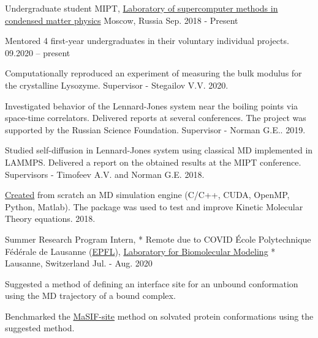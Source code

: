 

\begin{cventries}

  \cventry
    {Undergraduate student} %
    {MIPT, \href{http://en.smcmp.ru/}{Laboratory of supercomputer methods
in condensed matter physics}} %
    {Moscow, Russia} %
    {Sep. 2018 - Present} %
    {
      \begin{cvitems} %
        \item {\textsf{Mentored 4} first-year \textsf{undergraduates} in their voluntary individual projects. 09.2020 -- present}
        \item {Computationally reproduced an experiment of measuring the bulk modulus for the \textsf{crystalline Lysozyme}. Supervisor - Stegailov V.V. 2020.}
        \item {Investigated behavior of the \textsf{Lennard-Jones system} near the boiling points via space-time correlators. Delivered reports at \textsf{several conferences}. The project was supported by the Russian Science Foundation. Supervisor - Norman G.E.. 2019.}
      	\item {Studied self-diffusion in Lennard-Jones system using classical MD implemented in \textsf{LAMMPS}. Delivered a report on the obtained results at the MIPT conference. Supervisors - Timofeev A.V. and Norman G.E. 2018.}
      	\item {\href{https://github.com/PolyachenkoYA/molecules}{Created} from scratch an MD simulation engine (\textsf{C/C++, CUDA, OpenMP, Python, Matlab}). The package was used to test and improve Kinetic Molecular Theory equations.  2018.}
      \end{cvitems}
    }
    
  \cventry
    {Summer Research Program Intern, * Remote due to COVID} %
    {École Polytechnique Fédérale de Lausanne (\href{https://www.epfl.ch/en/}{EPFL}), \hspace{5pt}  \href{https://www.epfl.ch/labs/lbm/}{Laboratory for Biomolecular Modeling}} %
    {* Lausanne, Switzerland} %
    {Jul. - Aug. 2020} %
    {
      \begin{cvitems} %
		\item{Suggested a method of defining an interface site for an unbound conformation using the MD trajectory of a bound complex.}
        \item {Benchmarked the \href{https://www.nature.com/articles/s41592-019-0666-6}{MaSIF-site} method on solvated protein conformations using the suggested method.}
      \end{cvitems}
    }
    

\end{cventries}
